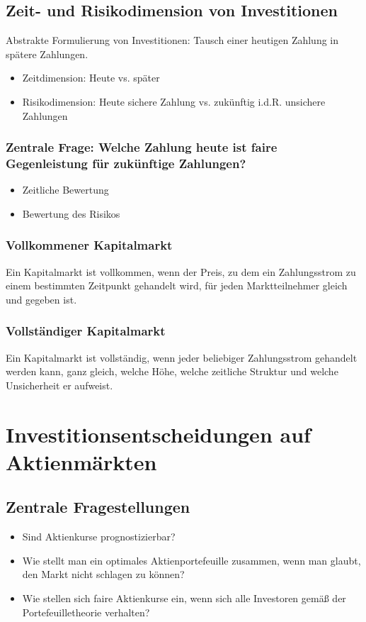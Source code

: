 \subsection{Zeit- und Risikodimension von Investitionen}
Abstrakte Formulierung von Investitionen: Tausch einer heutigen Zahlung in spätere Zahlungen.
\begin{itemize}
	\item Zeitdimension: Heute vs. später
	\item Risikodimension: Heute sichere Zahlung vs. zukünftig i.d.R. unsichere Zahlungen
\end{itemize}

\subsubsection{Zentrale Frage: Welche Zahlung heute ist faire Gegenleistung für zukünftige Zahlungen?}
\begin{itemize}
	\item Zeitliche Bewertung
	\item Bewertung des Risikos
\end{itemize}

\subsubsection{Vollkommener Kapitalmarkt}
Ein Kapitalmarkt ist vollkommen, wenn der Preis, zu dem ein Zahlungsstrom zu einem bestimmten Zeitpunkt gehandelt wird, für jeden Marktteilnehmer gleich und gegeben ist.

\subsubsection{Vollständiger Kapitalmarkt}
Ein Kapitalmarkt ist vollständig, wenn jeder beliebiger Zahlungsstrom gehandelt werden kann, ganz gleich, welche Höhe, welche zeitliche Struktur und welche Unsicherheit er aufweist.



\section{Investitionsentscheidungen auf Aktienmärkten}

\subsection{Zentrale Fragestellungen}
\begin{itemize}
	\item Sind Aktienkurse prognostizierbar?
	\item Wie stellt man ein optimales Aktienportefeuille zusammen, wenn man glaubt, den Markt nicht schlagen zu können?
	\item Wie stellen sich faire Aktienkurse ein, wenn sich alle Investoren gemäß der Portefeuilletheorie verhalten?
\end{itemize}


